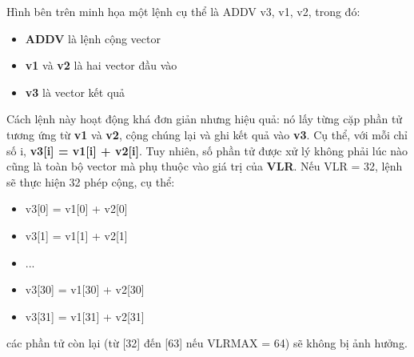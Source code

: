 \documentclass[a4paper]{article}
\begin{document}
Hình bên trên minh họa một lệnh cụ thể là ADDV v3, v1, v2, trong đó:

\begin{itemize}
    \item \textbf{ADDV} là lệnh cộng vector
    \item \textbf{v1} và \textbf{v2} là hai vector đầu vào 
    \item \textbf{v3} là vector kết quả
\end{itemize}
Cách lệnh này hoạt động khá đơn giản nhưng hiệu quả: nó lấy từng cặp phần tử tương ứng từ \textbf{v1} và \textbf{v2}, cộng chúng lại và ghi kết quả vào \textbf{v3}. Cụ thể, với mỗi chỉ số i, \textbf{v3[i] = v1[i] + v2[i]}. Tuy nhiên, số phần tử được xử lý không phải lúc nào cũng là toàn bộ vector mà phụ thuộc vào giá trị của \textbf{VLR}. Nếu VLR = 32, lệnh sẽ thực hiện 32 phép cộng, cụ thể:
\begin{itemize}
    \item v3[0] = v1[0] + v2[0]
    \item v3[1] = v1[1] + v2[1]
    \item ...
    \item v3[30] = v1[30] + v2[30]
    \item v3[31] = v1[31] + v2[31]
\end{itemize}
các phần tử còn lại (từ [32] đến [63] nếu VLRMAX = 64) sẽ không bị ảnh hưởng.
\end{document}
